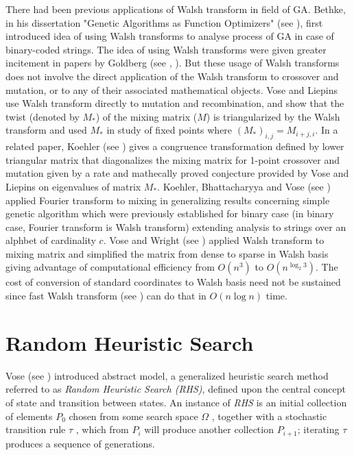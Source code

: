 There had been previous applications of Walsh transform in field of GA. Bethke, in his dissertation 
"Genetic Algorithms as Function Optimizers" (see \cite{Bethke1981}), first introduced 
idea of using Walsh transforms to analyse process of GA in case of binary-coded strings. The idea of using Walsh transforms 
were given greater incitement in papers by Goldberg (see \cite{Goldberg1989a}, \cite{Goldberg1989b}). But these usage of 
Walsh transforms does not involve the direct application of the Walsh transform to crossover and mutation, or to any of their 
associated mathematical objects. Vose and Liepins use Walsh transform directly to mutation and recombination, and show that the 
twist (denoted by $M_*$) of the mixing matrix ($M$) is triangularized by the Walsh transform and used $M_*$ in study of 
fixed points where $(M_*)_{i,j} = M_{i+j, i}$. In a related paper, Koehler (see \cite{Koehler1994}) gives a congruence 
transformation defined by lower triangular matrix that diagonalizes the mixing matrix for 1-point crossover and mutation 
given by a rate and mathecally proved conjecture provided by Vose and Liepins on eigenvalues of matrix $M_*$. Koehler, Bhattacharyya 
and Vose (see \cite{KoehlerBhatta1997}) applied Fourier transform to mixing in generalizing results concerning simple genetic algorithm 
which were previously established for binary case (in binary case, Fourier transform is Walsh transform) extending analysis to 
strings over an alphbet of cardinality $c$. Vose and Wright (see \cite{VoseWright1998}) applied Walsh transform to mixing matrix and 
simplified the matrix from dense to sparse in Walsh basis giving advantage of computational efficiency from 
$O(n^3)$ to $O(n^{{\log}_2 3})$. The cost of conversion of standard coordinates to Walsh basis need not be sustained 
since fast Walsh transform (see \cite{Shanks1969}) can do that in $O(n \log n)$ time.

\section{Random Heuristic Search}
Vose (see \cite{Vose1999}) introduced abstract model, a generalized heuristic search method referred 
to as {\em Random Heuristic Search (RHS)}, defined upon the central concept of state and transition 
between states. An instance of {\em RHS} is an initial collection of elements $P_0$ chosen 
from some search space $\Omega$ , together with a stochastic transition rule $\tau$ , which from $P_i$ will 
produce another collection $P_{i+1}$; iterating $\tau$ produces a sequence of generations.

